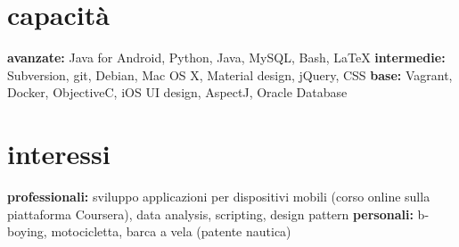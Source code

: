 \documentclass[print]{friggeri-custom} %
\begin{document}
\begin{entrylist}

\end{entrylist}


\section{capacità}

\textbf{avanzate:} Java for Android, Python, Java, MySQL, Bash, \LaTeX{} \textbf{intermedie:} Subversion, git, Debian, Mac OS X, Material design, jQuery, CSS \textbf{base:} Vagrant, Docker, ObjectiveC, iOS UI design, AspectJ, Oracle Database


\section{interessi}

\textbf{professionali:} sviluppo applicazioni per dispositivi mobili (corso online sulla piattaforma Coursera), data analysis, scripting, design pattern \textbf{personali:} b-boying, motocicletta, barca a vela (patente nautica)
\end{document}

